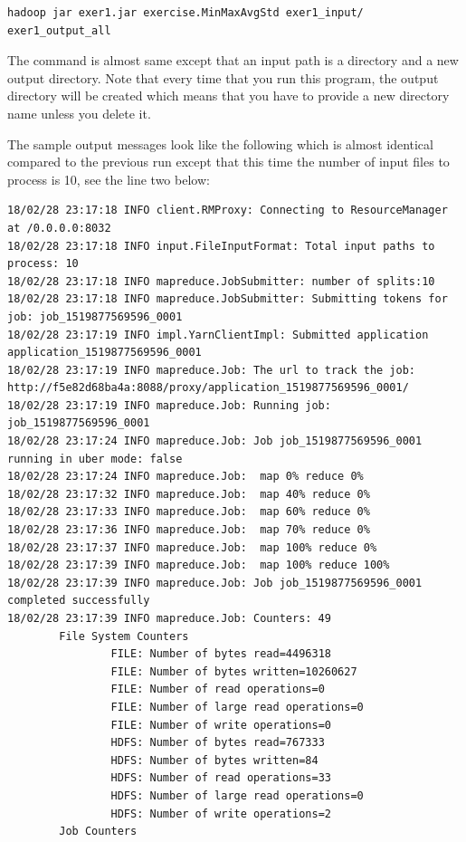 \begin{lstlisting}
hadoop jar exer1.jar exercise.MinMaxAvgStd exer1_input/ exer1_output_all
\end{lstlisting}

The command is almost same except that an input path is a directory
and a new output directory.  Note that every time that you run this
program, the output directory will be created which means that you
have to provide a new directory name unless you delete it.

The sample output messages look like the following which is almost
identical compared to the previous run except that this time the
number of input files to process is 10, see the line two below:

\begin{lstlisting}
18/02/28 23:17:18 INFO client.RMProxy: Connecting to ResourceManager at /0.0.0.0:8032
18/02/28 23:17:18 INFO input.FileInputFormat: Total input paths to process: 10
18/02/28 23:17:18 INFO mapreduce.JobSubmitter: number of splits:10
18/02/28 23:17:18 INFO mapreduce.JobSubmitter: Submitting tokens for job: job_1519877569596_0001
18/02/28 23:17:19 INFO impl.YarnClientImpl: Submitted application application_1519877569596_0001
18/02/28 23:17:19 INFO mapreduce.Job: The url to track the job: http://f5e82d68ba4a:8088/proxy/application_1519877569596_0001/
18/02/28 23:17:19 INFO mapreduce.Job: Running job: job_1519877569596_0001
18/02/28 23:17:24 INFO mapreduce.Job: Job job_1519877569596_0001 running in uber mode: false
18/02/28 23:17:24 INFO mapreduce.Job:  map 0% reduce 0%
18/02/28 23:17:32 INFO mapreduce.Job:  map 40% reduce 0%
18/02/28 23:17:33 INFO mapreduce.Job:  map 60% reduce 0%
18/02/28 23:17:36 INFO mapreduce.Job:  map 70% reduce 0%
18/02/28 23:17:37 INFO mapreduce.Job:  map 100% reduce 0%
18/02/28 23:17:39 INFO mapreduce.Job:  map 100% reduce 100%
18/02/28 23:17:39 INFO mapreduce.Job: Job job_1519877569596_0001 completed successfully
18/02/28 23:17:39 INFO mapreduce.Job: Counters: 49
        File System Counters
                FILE: Number of bytes read=4496318
                FILE: Number of bytes written=10260627
                FILE: Number of read operations=0
                FILE: Number of large read operations=0
                FILE: Number of write operations=0
                HDFS: Number of bytes read=767333
                HDFS: Number of bytes written=84
                HDFS: Number of read operations=33
                HDFS: Number of large read operations=0
                HDFS: Number of write operations=2
        Job Counters

\end{lstlisting}
